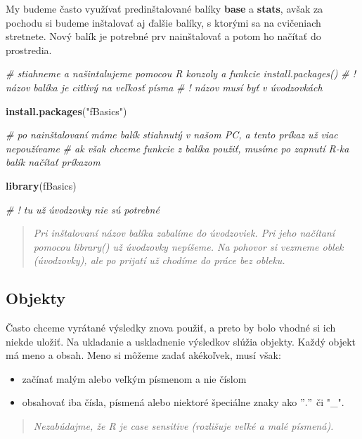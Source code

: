 \documentclass[]{article}
\newenvironment{Shaded}{\begin{snugshade}}{\end{snugshade}}
\newcommand{\CommentTok}[1]{\textcolor[rgb]{0.56,0.35,0.01}{\textit{#1}}}
\newcommand{\KeywordTok}[1]{\textcolor[rgb]{0.13,0.29,0.53}{\textbf{#1}}}
\newcommand{\NormalTok}[1]{#1}
\newcommand{\StringTok}[1]{\textcolor[rgb]{0.31,0.60,0.02}{#1}}
\providecommand{\tightlist}{%
  \setlength{\itemsep}{0pt}\setlength{\parskip}{0pt}}
\begin{document}
My budeme často využívať predinštalované balíky \textbf{base} a
\textbf{stats}, avšak za pochodu si budeme inštalovať aj ďalšie balíky,
s ktorými sa na cvičeniach stretnete. Nový balík je potrebné prv
nainštalovať a potom ho načítať do prostredia.

\begin{Shaded}
\begin{Highlighting}[]
\CommentTok{# stiahneme a našintalujeme pomocou R konzoly a funkcie install.packages()}
\CommentTok{# ! názov balíka je citlivý na veľkosť písma}
\CommentTok{# ! názov musí byť v úvodzovkách}

\KeywordTok{install.packages}\NormalTok{(}\StringTok{"fBasics"}\NormalTok{)}

\CommentTok{# po nainštalovaní máme balík stiahnutý v našom PC, a tento príkaz už viac nepoužívame}
\CommentTok{# ak však chceme funkcie z balíka použiť, musíme po zapnutí R-ka balík načítať príkazom}

\KeywordTok{library}\NormalTok{(fBasics)}

\CommentTok{# ! tu už úvodzovky nie sú potrebné}
\end{Highlighting}
\end{Shaded}

\begin{quote}
\emph{Pri inštalovaní názov balíka zabalíme do úvodzoviek. Pri jeho
načítaní pomocou library() už úvodzovky nepíšeme. Na pohovor si vezmeme
oblek (úvodzovky), ale po prijatí už chodíme do práce bez obleku.}
\end{quote}

\hypertarget{objekty}{%
\subsection{Objekty}\label{objekty}}

Často chceme vyrátané výsledky znova použiť, a preto by bolo vhodné si
ich niekde uložiť. Na ukladanie a uskladnenie výsledkov slúžia objekty.
Každý objekt má meno a obsah. Meno si môžeme zadať akékoľvek, musí však:

\begin{itemize}
\tightlist
\item
  začínať malým alebo veľkým písmenom a nie číslom
\item
  obsahovať iba čísla, písmená alebo niektoré špeciálne znaky ako
  \("."\) či "\_".
\end{itemize}

\begin{quote}
\emph{Nezabúdajme, že R je case sensitive (rozlišuje veľké a malé
písmená).}
\end{quote}
\end{document}
